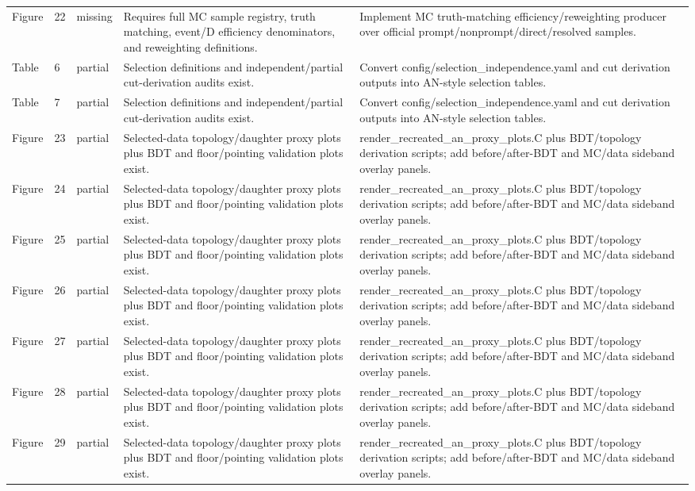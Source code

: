 \documentclass[11pt]{article}
\begin{document}
\begin{longtable}{lll p{} p{}}
Figure & 22 & missing & Requires full MC sample registry, truth matching, event/D efficiency denominators, and reweighting definitions. & Implement MC truth-matching efficiency/reweighting producer over official prompt/nonprompt/direct/resolved samples. \\
Table & 6 & partial & Selection definitions and independent/partial cut-derivation audits exist. & Convert config/selection\_independence.yaml and cut derivation outputs into AN-style selection tables. \\
Table & 7 & partial & Selection definitions and independent/partial cut-derivation audits exist. & Convert config/selection\_independence.yaml and cut derivation outputs into AN-style selection tables. \\
Figure & 23 & partial & Selected-data topology/daughter proxy plots plus BDT and floor/pointing validation plots exist. & render\_recreated\_an\_proxy\_plots.C plus BDT/topology derivation scripts; add before/after-BDT and MC/data sideband overlay panels. \\
Figure & 24 & partial & Selected-data topology/daughter proxy plots plus BDT and floor/pointing validation plots exist. & render\_recreated\_an\_proxy\_plots.C plus BDT/topology derivation scripts; add before/after-BDT and MC/data sideband overlay panels. \\
Figure & 25 & partial & Selected-data topology/daughter proxy plots plus BDT and floor/pointing validation plots exist. & render\_recreated\_an\_proxy\_plots.C plus BDT/topology derivation scripts; add before/after-BDT and MC/data sideband overlay panels. \\
Figure & 26 & partial & Selected-data topology/daughter proxy plots plus BDT and floor/pointing validation plots exist. & render\_recreated\_an\_proxy\_plots.C plus BDT/topology derivation scripts; add before/after-BDT and MC/data sideband overlay panels. \\
Figure & 27 & partial & Selected-data topology/daughter proxy plots plus BDT and floor/pointing validation plots exist. & render\_recreated\_an\_proxy\_plots.C plus BDT/topology derivation scripts; add before/after-BDT and MC/data sideband overlay panels. \\
Figure & 28 & partial & Selected-data topology/daughter proxy plots plus BDT and floor/pointing validation plots exist. & render\_recreated\_an\_proxy\_plots.C plus BDT/topology derivation scripts; add before/after-BDT and MC/data sideband overlay panels. \\
Figure & 29 & partial & Selected-data topology/daughter proxy plots plus BDT and floor/pointing validation plots exist. & render\_recreated\_an\_proxy\_plots.C plus BDT/topology derivation scripts; add before/after-BDT and MC/data sideband overlay panels. \\

\end{longtable}
\end{document}
